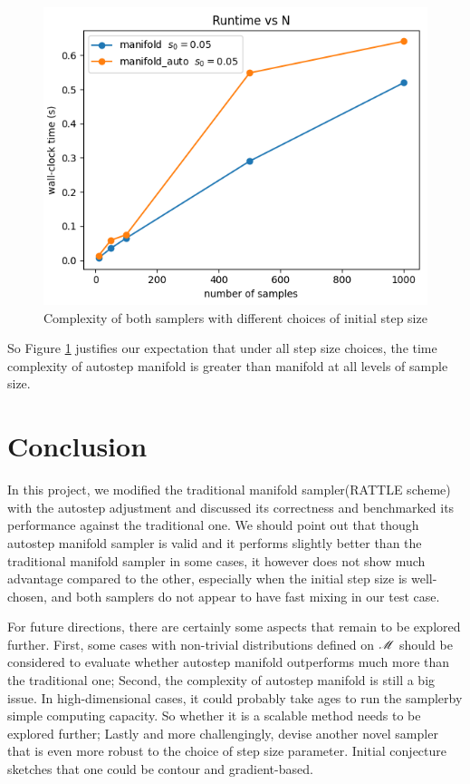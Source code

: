 \documentclass{article}
\begin{document}
\begin{figure}[H]
\begin{adjustbox}{width=\textwidth}
      \hspace{1em}
      \includegraphics[height=0.05\textheight]{runtime_good_s.png}
    \end{adjustbox}
    \caption{Complexity of both samplers with different choices of initial step size}
    \label{fig:time}
\end{figure}
So Figure \ref{fig:time} justifies our expectation that under all step size choices, the time complexity of autostep manifold is greater than manifold at all levels of sample size.



\section{Conclusion}
In this project, we modified the traditional manifold sampler(RATTLE scheme) with the autostep adjustment and discussed its correctness and benchmarked its performance against the traditional one. We should point out that though autostep manifold sampler is valid and it performs slightly better than the traditional manifold sampler in some cases, it however does not show much advantage compared to the other, especially when the initial step size is well-chosen, and both samplers do not appear to have fast mixing in our test case.

For future directions, there are certainly some aspects that remain to be explored further. First, some cases with non-trivial distributions defined on $\mathscr{M}$ should be considered to evaluate whether autostep manifold outperforms much more than the traditional one; Second, the complexity of autostep manifold is still a big issue. In high-dimensional cases, it could probably take ages to run the samplerby simple computing capacity. So whether it is a scalable method needs to be explored further; Lastly and more challengingly, devise another novel sampler that is even more robust to the choice of step size parameter. Initial conjecture sketches that one could be contour and gradient-based.
\end{document}
